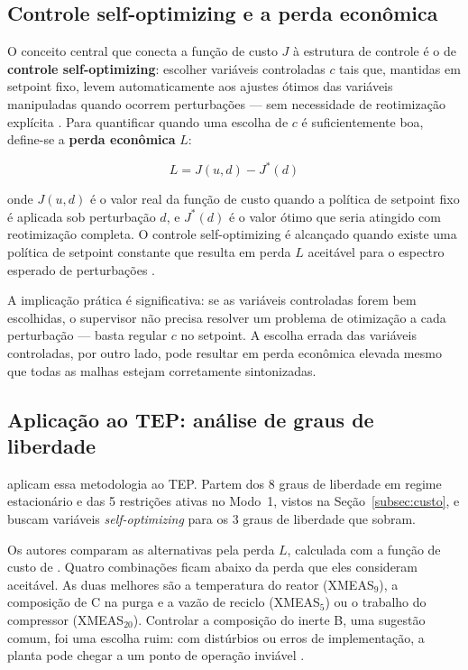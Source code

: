 \subsection{Controle self-optimizing e a perda econômica}

O conceito central que conecta a função de custo $J$ à estrutura de controle é o de
\textbf{controle self-optimizing}: escolher variáveis controladas $c$ tais que, mantidas em setpoint
fixo, levem automaticamente aos ajustes ótimos das variáveis manipuladas quando ocorrem perturbações
--- sem necessidade de reotimização explícita \cite{Skogestad2004}. Para quantificar quando uma
escolha de $c$ é suficientemente boa, define-se a \textbf{perda econômica} $L$:

\begin{equation}
	L = J(u, d) - J^*(d)
	\label{eq:loss}
\end{equation}

\noindent onde $J(u,d)$ é o valor real da função de custo quando a política de setpoint fixo é
aplicada sob perturbação $d$, e $J^*(d)$ é o valor ótimo que seria atingido com reotimização
completa. O controle self-optimizing é alcançado quando existe uma política de setpoint constante
que resulta em perda $L$ aceitável para o espectro esperado de perturbações \cite{Skogestad2004}.

A implicação prática é significativa: se as variáveis controladas forem bem escolhidas, o supervisor
não precisa resolver um problema de otimização a cada perturbação --- basta regular $c$ no setpoint.
A escolha errada das variáveis controladas, por outro lado, pode resultar em perda econômica elevada
mesmo que todas as malhas estejam corretamente sintonizadas.

\subsection{Aplicação ao TEP: análise de graus de liberdade}

 aplicam essa metodologia ao TEP. Partem dos 8 graus de liberdade em regime estacionário e das 5 restrições ativas no Modo~1, vistos na Seção~\ref{subsec:custo}, e buscam variáveis \textit{self-optimizing} para os 3 graus de liberdade que sobram.

Os autores comparam as alternativas pela perda $L$, calculada com a função de custo de . Quatro combinações ficam abaixo da perda que eles consideram aceitável. As duas melhores são a temperatura do reator (XMEAS$_9$), a composição de C na purga e a vazão de reciclo (XMEAS$_5$) ou o trabalho do compressor (XMEAS$_{20}$). Controlar a composição do inerte B, uma sugestão comum, foi uma escolha ruim: com distúrbios ou erros de implementação, a planta pode chegar a um ponto de operação inviável \cite{Larsson2001}.

